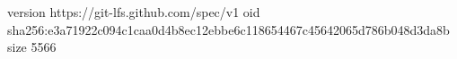 version https://git-lfs.github.com/spec/v1
oid sha256:e3a71922c094c1caa0d4b8ec12ebbe6c118654467c45642065d786b048d3da8b
size 5566
